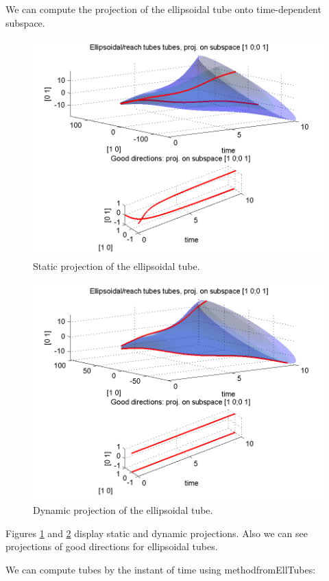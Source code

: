 \documentclass[letterpaper,10pt,english]{sphinxmanual}
\begin{document}
We can compute the projection of the ellipsoidal
tube onto time-dependent subspace.
\begin{figure}[htbp]
\centering
\capstart

\includegraphics[width=0.500\linewidth]{chapter05_section03_reachTubeStatProj.png}
\caption{Static projection of the ellipsoidal tube.}\label{chap_implement:stat-proj}\end{figure}
\begin{figure}[htbp]
\centering
\capstart

\includegraphics[width=0.500\linewidth]{chapter05_section03_reachTubeDynProj.png}
\caption{Dynamic projection of the ellipsoidal tube.}\label{chap_implement:dyn-proj}\end{figure}

Figures \hyperref[chap_implement:stat-proj]{ \ref*{chap_implement:stat-proj}} and \hyperref[chap_implement:dyn-proj]{ \ref*{chap_implement:dyn-proj}} display static and dynamic projections.
Also we can see projections of good directions for ellipsoidal tubes.

We can compute tubes by the instant of time using methodfromEllTubes:
\end{document}
